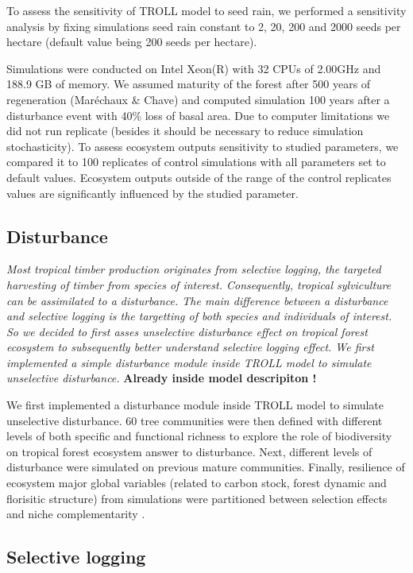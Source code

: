 \documentclass[12pt,]{article}
\theoremstyle{definition}
\theoremstyle{definition}
\theoremstyle{remark}
\begin{document}
To assess the sensitivity of TROLL model to seed rain, we performed a
sensitivity analysis by fixing simulations seed rain constant to 2, 20,
200 and 2000 seeds per hectare (default value being 200 seeds per
hectare).

Simulations were conducted on Intel Xeon(R) with 32 CPUs of 2.00GHz and
188.9 GB of memory. We assumed maturity of the forest after 500 years of
regeneration (Maréchaux \& Chave) and computed simulation 100 years
after a disturbance event with 40\% loss of basal area. Due to computer
limitations we did not run replicate (besides it should be necessary to
reduce simulation stochasticity). To assess ecosystem outputs
sensitivity to studied parameters, we compared it to 100 replicates of
control simulations with all parameters set to default values. Ecosystem
outputs outside of the range of the control replicates values are
significantly influenced by the studied parameter.

\subsection{Disturbance}\label{disturbance-1}

\emph{Most tropical timber production originates from selective logging,
the targeted harvesting of timber from species of interest.
Consequently, tropical sylviculture can be assimilated to a disturbance.
The main difference between a disturbance and selective logging is the
targetting of both species and individuals of interest. So we decided to
first asses unselective disturbance effect on tropical forest ecosystem
to subsequently better understand selective logging effect. We first
implemented a simple disturbance module inside TROLL model to simulate
unselective disturbance.} \textbf{Already inside model descripiton !}

We first implemented a disturbance module inside TROLL model to simulate
unselective disturbance. 60 tree communities were then defined with
different levels of both specific and functional richness to explore the
role of biodiversity on tropical forest ecosystem answer to disturbance.
Next, different levels of disturbance were simulated on previous mature
communities. Finally, resilience of ecosystem major global variables
(related to carbon stock, forest dynamic and florisitic structure) from
simulations were partitioned between selection effects and niche
complementarity \citep{Loreau2001}.

\subsection{Selective logging}\label{selective-logging}
\end{document}
